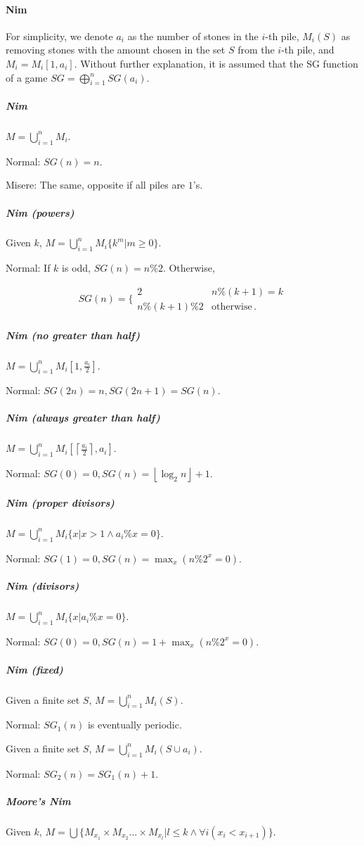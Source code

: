 \paragraph{Nim}
For simplicity, we denote $a_i$ as the number of stones in the $i$-th pile, $M_i(S)$ as removing stones with the amount chosen in the set $S$ from the $i$-th pile, and $M_i=M_i[1,a_i]$. Without further explanation, it is assumed that the SG function of a game $SG=\bigoplus_{i=1}^nSG(a_i)$.

\subparagraph{Nim}
$M=\bigcup_{i=1}^nM_i$.

Normal: $SG(n)=n$.

Misere: The same, opposite if all piles are $1$'s.

\subparagraph{Nim (powers)}
Given $k$, $M=\bigcup_{i=1}^nM_i\{k^m|m\ge 0\}$.

Normal: If $k$ is odd, $SG(n)=n\%2$. Otherwise,

$$SG(n)=\biggl\{\begin{array}{lr}
2 & n\%(k+1)=k \\
n\%(k+1)\%2 & \mathrm{otherwise}\,.\end{array}$$

\subparagraph{Nim (no greater than half)}
$M=\bigcup_{i=1}^nM_i[1,\frac{a_i}{2}]$.

Normal: $SG(2n)=n,SG(2n+1)=SG(n)$.

\subparagraph{Nim (always greater than half)}
$M=\bigcup_{i=1}^nM_i[\left\lceil \frac{a_i}{2}\right\rceil, a_i]$.

Normal: $SG(0)=0,SG(n)=\left\lfloor \log_2 n\right\rfloor +1$.

\subparagraph{Nim (proper divisors)}
$M=\bigcup_{i=1}^nM_i\{x|x>1\wedge a_i\% x=0\}$.

Normal: $SG(1)=0,SG(n)=\max_x(n\%2^x=0)$.

\subparagraph{Nim (divisors)}
$M=\bigcup_{i=1}^nM_i\{x|a_i\% x=0\}$.

Normal: $SG(0)=0,SG(n)=1+\max_x(n\%2^x=0)$.

\subparagraph{Nim (fixed)}
Given a finite set $S$, $M=\bigcup_{i=1}^nM_i(S)$.

Normal: $SG_1(n)$ is eventually periodic.

Given a finite set $S$, $M=\bigcup_{i=1}^nM_i(S\cup {a_i})$.

Normal: $SG_2(n)=SG_1(n)+1$.

\subparagraph{Moore's Nim}
Given $k$, $M=\bigcup\{M_{x_1}\times M_{x_2} \dots\times M_{x_l}|l\le k \wedge\forall i(x_i<x_{i+1})\}$.


